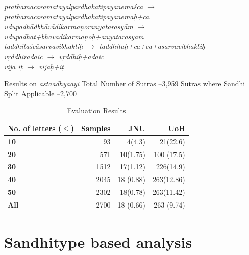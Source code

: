 \documentclass[11pt]{article}
\begin{document}
\textit{prathamacaramatay\={a}lp\={a}rdhakatipayanem\={a}\'{s}ca $\rightarrow$ prathamacaramatay\={a}lp\={a}rdhakatipayanem\={a}\d{h}+ca \\
udupadh\={a}dbh\={a}v\={a}dikarma\d{n}oranyatarasy\={a}m $\rightarrow$ udupadh\={a}t+bh\={a}v\={a}dikarma\d{n}o\d{h}+anyatarasy\={a}m \\
taddhita\'{s}c\={a}sarvavibhakti\d{h} $\rightarrow$ taddhita\d{h}+ca+ca+asarvavibhakti\d{h} \\
v\d{r}ddhir\={a}daic $\rightarrow$ v\d{r}ddhi\d{h}+\={a}daic \\
vija i\d{t} $\rightarrow$ vija\d{h}+i\d{t} \\                                                 
}

Results on \textit{\={a}staadhyaayi}
Total Number of Sutras –3,959
Sutras where Sandhi Split Applicable –2,700
    


\begin{table}[h]
\begin{center}
\begin{tabular}{ p{2cm}  r r r }
\hline  
\bf No. of letters ($\le$) & Samples & JNU & UoH \\
\hline
\bf 10 & 93 & 4(4.3) & 21(22.6) \\
\bf 20 & 571 & 10(1.75) & 100 (17.5) \\
\bf 30 & 1512 & 17(1.12) & 226(14.9) \\
\bf 40 & 2045 & 18 (0.88) & 263(12.86) \\
\bf 50 & 2302 & 18(0.78) & 263(11.42) \\
\bf All  & 2700 & 18 (0.66) & 263 (9.74) \\
\hline
\end{tabular}
\end{center}
\caption{\label{font-table} Evaluation Results }
\end{table}


\section{Sandhitype based analysis}
\end{document}
